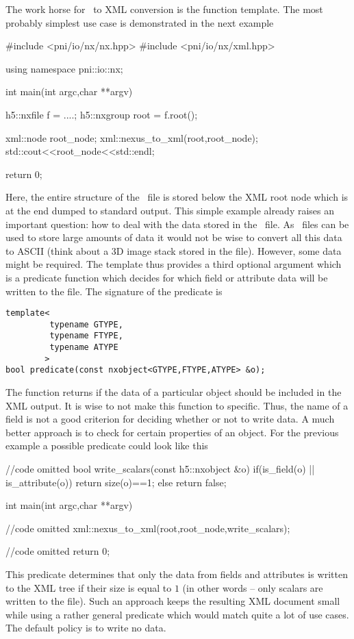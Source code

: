 The work horse for \nexus\ to XML conversion is the  
function template. The most probably simplest use case is demonstrated in the 
next example 
\begin{cppcode}
#include <pni/io/nx/nx.hpp>
#include <pni/io/nx/xml.hpp>

using namespace pni::io::nx;

int main(int argc,char **argv)
{
    h5::nxfile f = ....;
    h5::nxgroup root = f.root();

    xml::node root_node;
    xml::nexus_to_xml(root,root_node);
    std::cout<<root_node<<std::endl;

    return 0;
}
\end{cppcode}
Here, the entire structure of the \nexus\ file is stored below the XML root 
node which is at the end dumped to standard output.
This simple example already raises an important question: how to deal with the
data stored in the \nexus\ file. As \nexus\ files can be used to store large 
amounts of data it would not be wise to convert all this data to ASCII (think 
about a 3D image stack stored in the file). However, some data might be 
required. 
The  template thus provides a third optional argument which 
is a predicate function which decides for which field or attribute data will be
written to the file. 
The signature of the predicate is 
\begin{verbatim}
template<
         typename GTYPE,
         typename FTYPE,
         typename ATYPE
        >
bool predicate(const nxobject<GTYPE,FTYPE,ATYPE> &o);
\end{verbatim}
The function returns  if the data of a particular object should be 
included in the XML output. 
It is wise to not make this function to specific. Thus, the name of a field 
is not a good criterion for deciding whether or not to write data. A much 
better approach is to check for certain properties of an object. For the 
previous example a possible predicate could look like this
\begin{cppcode}
//code omitted 
bool write_scalars(const h5::nxobject &o)
{
    if(is_field(o) || is_attribute(o))
    {
       return size(o)==1;
    }
    else 
        return false;
}

int main(int argc,char **argv)
{
    //code omitted 
    xml::nexus_to_xml(root,root_node,write_scalars);

    //code omitted
    return 0;
}
\end{cppcode}
This predicate determines that only the data from fields and attributes 
is written to the XML tree if their size is equal to $1$ (in other words -- 
only scalars are written to the file). 
Such an approach keeps the resulting XML document small while using a rather 
general predicate which would match quite a lot of use cases. The default 
policy is to write no data.


